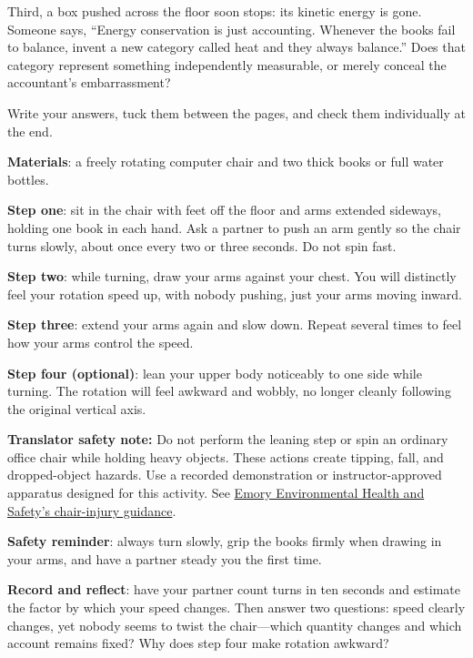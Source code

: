 Third, a box pushed across the floor soon stops: its kinetic energy is gone. Someone says, ``Energy conservation is just accounting. Whenever the books fail to balance, invent a new category called heat and they always balance.'' Does that category represent something independently measurable, or merely conceal the accountant's embarrassment?

Write your answers, tuck them between the pages, and check them individually at the end.


\begin{experiment}
\textbf{Materials}: a freely rotating computer chair and two thick books or full water bottles.

\textbf{Step one}: sit in the chair with feet off the floor and arms extended sideways, holding one book in each hand. Ask a partner to push an arm gently so the chair turns slowly, about once every two or three seconds. Do not spin fast.

\textbf{Step two}: while turning, draw your arms against your chest. You will distinctly feel your rotation speed up, with nobody pushing, just your arms moving inward.

\textbf{Step three}: extend your arms again and slow down. Repeat several times to feel how your arms control the speed.

\textbf{Step four (optional)}: lean your upper body noticeably to one side while turning. The rotation will feel awkward and wobbly, no longer cleanly following the original vertical axis.

\textbf{Translator safety note:} Do not perform the leaning step or spin an ordinary office chair while holding heavy objects. These actions create tipping, fall, and dropped-object hazards. Use a recorded demonstration or instructor-approved apparatus designed for this activity. See \href{https://ehso.emory.edu/sso/documents/toolbox-training_reducing-chair-related-injuries.pdf}{Emory Environmental Health and Safety's chair-injury guidance}.

\textbf{Safety reminder}: always turn slowly, grip the books firmly when drawing in your arms, and have a partner steady you the first time.

\textbf{Record and reflect}: have your partner count turns in ten seconds and estimate the factor by which your speed changes. Then answer two questions: speed clearly changes, yet nobody seems to twist the chair---which quantity changes and which account remains fixed? Why does step four make rotation awkward?
\end{experiment}

